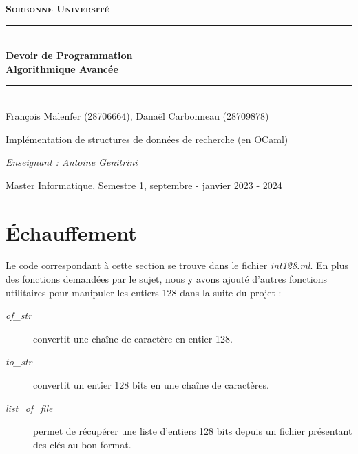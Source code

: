 \documentclass[12pt,a4paper]{article}
\author{Malenfer François, Carbonneau Danaël}
\begin{document}
\begin{titlepage}
\newcommand{\HRule}{\rule{\linewidth}{0.5mm}}



\center 
\bigskip
\textsc{\LARGE\textbf{
\color{teal}Sorbonne Université}
}
 \\[4cm]
 {\color{Bittersweet}\HRule} \\[0.4cm]
{ \huge \bfseries \color{darkgray} Devoir de Programmation \\[0.15cm] }
\textbf{Algorithmique Avancée}
{\color{Bittersweet}\HRule} \\[0.5cm]

{\color{darkgray} François Malenfer (28706664), Danaël Carbonneau (28709878)} \\[3cm]

\begin{huge}
{\selectfont
Implémentation de structures de données de recherche (en OCaml)\cite{leroy3ocaml}
}
\end{huge}


\vfill

\textit{Enseignant : Antoine Genitrini}

Master Informatique, Semestre 1, septembre - janvier 2023 - 2024 \\ [1cm]

\end{titlepage}


\setcounter{tocdepth}{2}
\tableofcontents


\newpage
 \section{Échauffement}
Le code correspondant à cette section se trouve dans le fichier \textit{int128.ml}. En plus des fonctions demandées par le sujet, nous y avons ajouté d'autres fonctions utilitaires pour manipuler les entiers 128 dans la suite du projet : 

\begin{description}

\item[\textit{of\_str}] convertit une chaîne de caractère en entier 128.
\item[\textit{to\_str}] convertit un entier 128 bits en une chaîne de caractères.
\item[\textit{list\_of\_file}] permet de récupérer une liste d'entiers 128 bits depuis un fichier présentant des clés au bon format.
\end{description}
\end{document}
